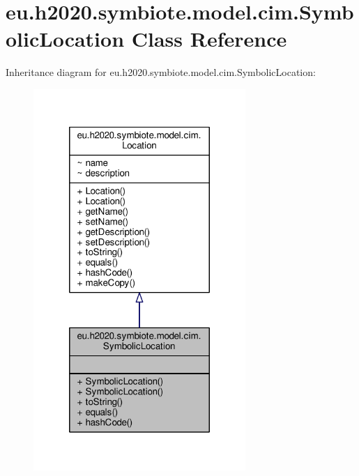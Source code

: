 \hypertarget{classeu_1_1h2020_1_1symbiote_1_1model_1_1cim_1_1SymbolicLocation}{}\section{eu.\+h2020.\+symbiote.\+model.\+cim.\+Symbolic\+Location Class Reference}
\label{classeu_1_1h2020_1_1symbiote_1_1model_1_1cim_1_1SymbolicLocation}


Inheritance diagram for eu.\+h2020.\+symbiote.\+model.\+cim.\+Symbolic\+Location\+:
\nopagebreak
\begin{figure}[H]
\begin{center}
\leavevmode
\includegraphics[width=228pt]{classeu_1_1h2020_1_1symbiote_1_1model_1_1cim_1_1SymbolicLocation__inherit__graph}
\end{center}
\end{figure}


